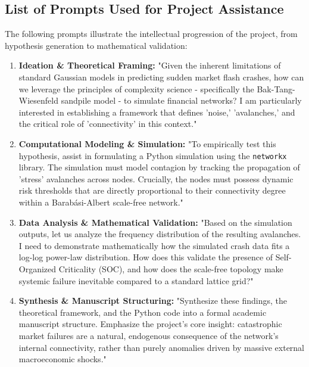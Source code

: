 \documentclass[final,5p,times,twocolumn,authoryear]{elsarticle}
\begin{document}
\subsection{List of Prompts Used for Project Assistance}
The following prompts illustrate the intellectual progression of the project, from hypothesis generation to mathematical validation:
\begin{enumerate}
    \item \textbf{Ideation \& Theoretical Framing:} "Given the inherent limitations of standard Gaussian models in predicting sudden market flash crashes, how can we leverage the principles of complexity science - specifically the Bak-Tang-Wiesenfeld sandpile model - to simulate financial networks? I am particularly interested in establishing a framework that defines 'noise,' 'avalanches,' and the critical role of 'connectivity' in this context."
    \item \textbf{Computational Modeling \& Simulation:} "To empirically test this hypothesis, assist in formulating a Python simulation using the \texttt{networkx} library. The simulation must model contagion by tracking the propagation of 'stress' avalanches across nodes. Crucially, the nodes must possess dynamic risk thresholds that are directly proportional to their connectivity degree within a Barabási-Albert scale-free network."
    \item \textbf{Data Analysis \& Mathematical Validation:} "Based on the simulation outputs, let us analyze the frequency distribution of the resulting avalanches. I need to demonstrate mathematically how the simulated crash data fits a log-log power-law distribution. How does this validate the presence of Self-Organized Criticality (SOC), and how does the scale-free topology make systemic failure inevitable compared to a standard lattice grid?"
    \item \textbf{Synthesis \& Manuscript Structuring:} "Synthesize these findings, the theoretical framework, and the Python code into a formal academic manuscript structure. Emphasize the project's core insight: catastrophic market failures are a natural, endogenous consequence of the network's internal connectivity, rather than purely anomalies driven by massive external macroeconomic shocks."
\end{enumerate}
\end{document}
